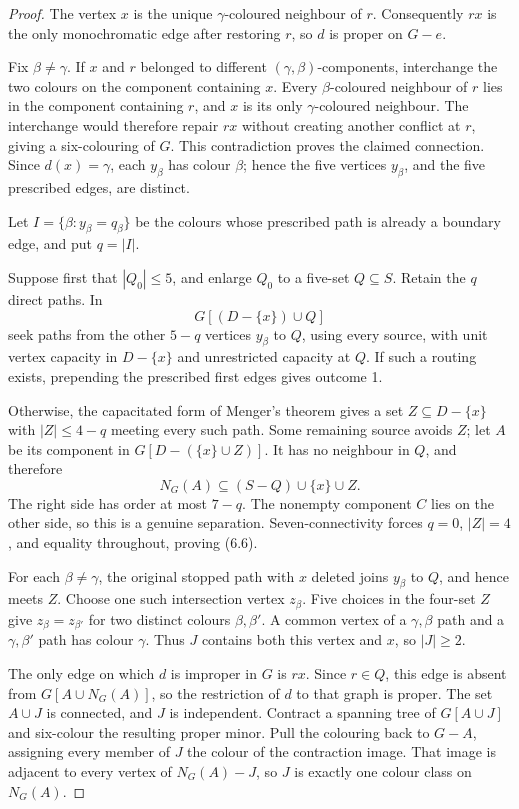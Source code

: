 \documentclass[11pt]{amsart}
\begin{document}
\begin{proof}
The vertex $x$ is the unique $\gamma$-coloured neighbour of $r$.
Consequently $rx$ is the only monochromatic edge after restoring $r$, so
$d$ is proper on $G-e$.

Fix $\beta\ne\gamma$.  If $x$ and $r$ belonged to different
$(\gamma,\beta)$-components, interchange the two colours on the component
containing $x$.  Every $\beta$-coloured neighbour of $r$ lies in the
component containing $r$, and $x$ is its only $\gamma$-coloured neighbour.
The interchange would therefore repair $rx$ without creating another
conflict at $r$, giving a six-colouring of $G$.  This contradiction proves
the claimed connection.  Since $d(x)=\gamma$, each $y_\beta$ has colour
$\beta$; hence the five vertices $y_\beta$, and the five prescribed edges,
are distinct.

Let $I=\{\beta:y_\beta=q_\beta\}$ be the colours whose prescribed path is
already a boundary edge, and put $q=|I|$.

Suppose first that $|Q_0|\leq5$, and enlarge $Q_0$ to a five-set
$Q\subseteq S$.  Retain the $q$ direct paths.  In
\[
                    G[(D-\{x\})\cup Q]
\]
seek paths from the other $5-q$ vertices $y_\beta$ to $Q$, using every
source, with unit vertex capacity in $D-\{x\}$ and unrestricted capacity
at $Q$.  If such a routing exists, prepending the prescribed first edges
gives outcome 1.

Otherwise, the capacitated form of Menger's theorem gives a set
$Z\subseteq D-\{x\}$ with $|Z|\leq4-q$ meeting every such path.  Some
remaining source avoids $Z$; let $A$ be its component in
$G[D-(\{x\}\cup Z)]$.  It has no neighbour in $Q$, and therefore
\[
             N_G(A)\subseteq(S-Q)\cup\{x\}\cup Z.
\]
The right side has order at most $7-q$.  The nonempty component $C$ lies
on the other side, so this is a genuine separation.  Seven-connectivity
forces $q=0$, $|Z|=4$, and equality throughout, proving (6.6).

For each $\beta\ne\gamma$, the original stopped path with $x$ deleted
joins $y_\beta$ to $Q$, and hence meets $Z$.  Choose one such intersection
vertex $z_\beta$.  Five choices in the four-set $Z$ give
$z_\beta=z_{\beta'}$ for two distinct colours $\beta,\beta'$.  A common
vertex of a $\gamma,\beta$ path and a $\gamma,\beta'$ path has colour
$\gamma$.  Thus $J$ contains both this vertex and $x$, so $|J|\geq2$.

The only edge on which $d$ is improper in $G$ is $rx$.  Since $r\in Q$,
this edge is absent from $G[A\cup N_G(A)]$, so the restriction of $d$ to
that graph is proper.  The set $A\cup J$ is connected, and $J$ is independent.
Contract a spanning tree of $G[A\cup J]$ and six-colour the resulting
proper minor.  Pull the colouring back to $G-A$, assigning every member of
$J$ the colour of the contraction image.  That image is adjacent to every
vertex of $N_G(A)-J$, so $J$ is exactly one colour class on $N_G(A)$.


\end{proof}
\end{document}
